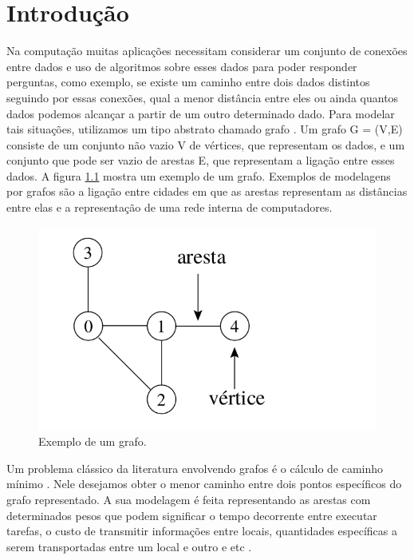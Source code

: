 \chapter{Introdução}
\label{sec-intro}
Na computação muitas aplicações necessitam considerar um conjunto de conexões entre dados e uso de algoritmos sobre esses dados para poder responder perguntas, como exemplo, se existe um caminho entre dois dados distintos seguindo por essas conexões, qual a menor distância entre eles ou ainda quantos dados podemos alcançar a partir de um outro determinado dado. Para modelar tais situações, utilizamos um tipo abstrato chamado grafo \cite{ziviani2004projeto}. Um grafo G = (V,E) consiste de um conjunto não vazio V de vértices, que representam os dados, e um conjunto que pode ser vazio de arestas E, que representam a ligação entre esses dados. A figura \ref{fig-intro-exemplografo} mostra um exemplo de um grafo. Exemplos de modelagens por grafos são a ligação entre cidades em que as arestas representam as distâncias entre elas e a representação de uma rede interna de computadores. 

\begin{figure}[H]
\centering
\includegraphics[width=.65\textwidth]{figuras/grafo-exemplo} 
\caption{Exemplo de um grafo.}
\label{fig-intro-exemplografo}
\end{figure}

Um problema clássico da literatura envolvendo grafos é o cálculo de caminho mínimo \cite{moura2010estudo}. Nele desejamos obter o menor caminho entre dois pontos específicos do grafo representado. A sua modelagem é feita representando as arestas com determinados pesos que podem significar o tempo decorrente entre executar tarefas, o custo de transmitir informações entre locais, quantidades específicas a serem transportadas entre um local e outro e etc \cite{drozdek2012data}. 

